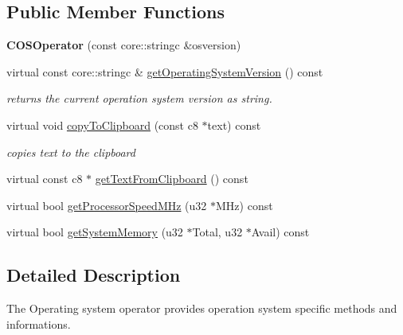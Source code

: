 \subsection*{Public Member Functions}
\begin{DoxyCompactItemize}
\item 
\hypertarget{classirr_1_1_c_o_s_operator_a860c05dd8b793193e2f5a78c88ab1034}{{\bfseries C\-O\-S\-Operator} (const core\-::stringc \&osversion)}\label{classirr_1_1_c_o_s_operator_a860c05dd8b793193e2f5a78c88ab1034}

\item 
virtual const core\-::stringc \& \hyperlink{classirr_1_1_c_o_s_operator_a2ca0531582a8c7d72228e006e6700654}{get\-Operating\-System\-Version} () const 
\begin{DoxyCompactList}\small\item\em returns the current operation system version as string. \end{DoxyCompactList}\item 
\hypertarget{classirr_1_1_c_o_s_operator_ad76a87772c572b108801cbd1523a0d3e}{virtual void \hyperlink{classirr_1_1_c_o_s_operator_ad76a87772c572b108801cbd1523a0d3e}{copy\-To\-Clipboard} (const c8 $\ast$text) const }\label{classirr_1_1_c_o_s_operator_ad76a87772c572b108801cbd1523a0d3e}

\begin{DoxyCompactList}\small\item\em copies text to the clipboard \end{DoxyCompactList}\item 
virtual const c8 $\ast$ \hyperlink{classirr_1_1_c_o_s_operator_afcf3f5158b24ee63bf295db317eb6e99}{get\-Text\-From\-Clipboard} () const 
\item 
virtual bool \hyperlink{classirr_1_1_c_o_s_operator_a77e21742c1f9734cb14d1da4dbf388b4}{get\-Processor\-Speed\-M\-Hz} (u32 $\ast$M\-Hz) const 
\item 
virtual bool \hyperlink{classirr_1_1_c_o_s_operator_ad6b40407fd8b0f2569b9dbbcb84e9825}{get\-System\-Memory} (u32 $\ast$Total, u32 $\ast$Avail) const 
\end{DoxyCompactItemize}


\subsection{Detailed Description}
The Operating system operator provides operation system specific methods and informations. 

